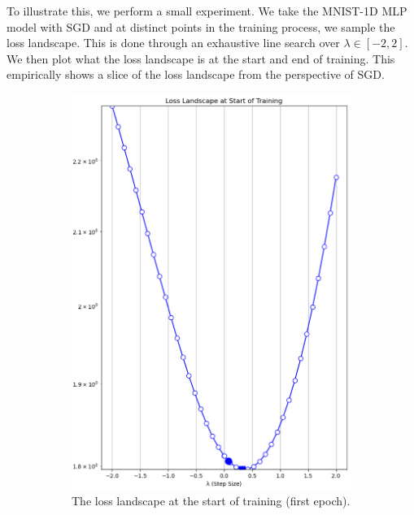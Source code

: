 To illustrate this, we perform a small experiment. We take the MNIST-1D MLP model with SGD and at distinct points in the training process, we sample the loss landscape. This is done through an exhaustive line search over $\lambda \in [-2, 2]$. We then plot what the loss landscape is at the start and end of training. This empirically shows a slice of the loss landscape from the perspective of SGD. 

\begin{figure}[!t]
    \begin{subfigure}[b]{0.49\linewidth}
        \centering
        \includegraphics[width=\linewidth, height=0.4\textheight]{figures/5evals/ll_sgd_start.png}
        \caption{The loss landscape at the start of training (first epoch).}
        \label{fig:ll_sgd_start}
    \end{subfigure}
    \hfill
    \begin{subfigure}[b]{0.49\linewidth}

\end{subfigure}
\end{figure}
